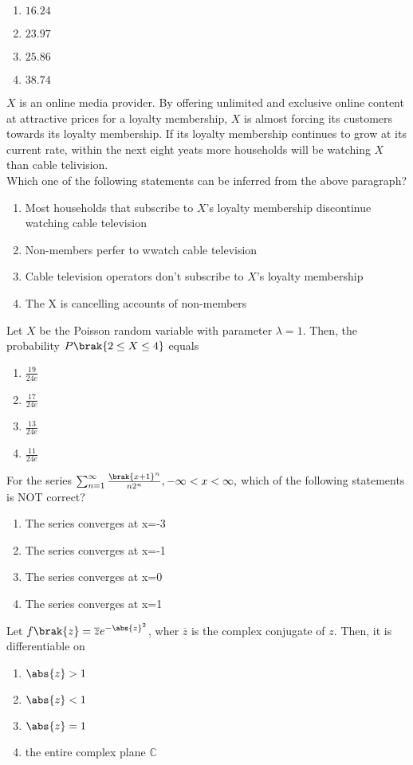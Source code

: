 \begin{enumerate}
	\item $16.24$
	\item $23.97$
	\item $25.86$
	\item $38.74$
\end{enumerate}
\item $X$ is an online media provider. By offering unlimited and exclusive online content at attractive prices for a loyalty membership, $X$ is almost forcing its customers towards its loyalty membership. If its loyalty membership continues to grow at its current rate, within the next eight yeats more households will be watching $X$ than cable telivision.\\ Which one of the following statements can be inferred from the above paragraph?
	\begin{enumerate}
		\item Most households that subscribe to $X$'s loyalty membership discontinue watching cable television
		\item Non-members perfer to wwatch cable television
		\item Cable television operators don't subscribe to $X$'s loyalty membership
		\item The X is cancelling accounts of non-members
	\end{enumerate}
\item Let $X$ be the Poisson random variable with parameter $\lambda=1$. Then, the probability $P\brak{2\leq X\leq 4}$ equals
	\begin{enumerate}
		\item $\frac{19}{24e}$
		\item $\frac{17}{24e}$
		\item $\frac{13}{24e}$
		\item $\frac{11}{24e}$
\end{enumerate}
\item For the series $\sum_{n=1}^{\infty}\frac{\brak{x+1}^n}{n 2^n},-\infty<x<\infty,$ which of the following statements is NOT correct?
	\begin{enumerate}
	\item The series converges at x=-3
	\item The series converges at x=-1		  \item The series converges at x=0
	\item The series converges at x=1
\end{enumerate}
\item Let $f\brak{z}= \overline{z}e^{-\abs{z}^2}$, wher $\overline{z}$ is the complex conjugate of $z$. Then, it is differentiable on
	\begin{enumerate}
		\item $\abs{z}>1$
		\item $\abs{z}<1$
		\item $\abs{z}=1$
		\item the entire complex plane $\mathbb{C}$
	\end{enumerate}

